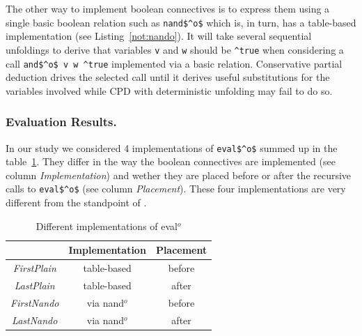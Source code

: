 The other way to implement boolean connectives is to express them using a single basic boolean relation such as \lstinline{nand$^o$} which is, in turn, has a table-based
implementation (see Listing~\ref{not:nando}). It will take several sequential unfoldings to derive that variables \lstinline{v} and \lstinline{w} should
be \lstinline{^true} when considering a call \lstinline{and$^o$ v w ^true} implemented via a basic relation.
Conservative partial deduction drives the selected call until it derives useful substitutions for the variables involved while CPD with deterministic unfolding may fail to do so.


\subsubsection{Evaluation Results.}
In our study we considered 4 implementations of \lstinline{eval$^o$} summed up in the table~\ref{tbl:eval}. They differ in the way the boolean connectives are implemented (see column \emph{Implementation}) and wether they are placed before or after the recursive calls to \lstinline{eval$^o$} (see column \emph{Placement}).
These four implementations are very different from the  standpoint of \ecce.

\begin{table}
    \centering
    \begin{tabular}{c||c||c}
                      & Implementation & Placement \\ \hline\hline
    \emph{FirstPlain} & table-based    & before \\ \hline
    \emph{LastPlain}  & table-based    & after  \\ \hline
    \emph{FirstNando} & via nand$^o$   & before \\ \hline
    \emph{LastNando}  & via nand$^o$   & after  \\
    \end{tabular}

  \caption{Different implementations of eval$^o$}
  \label{tbl:eval}
\end{table}


